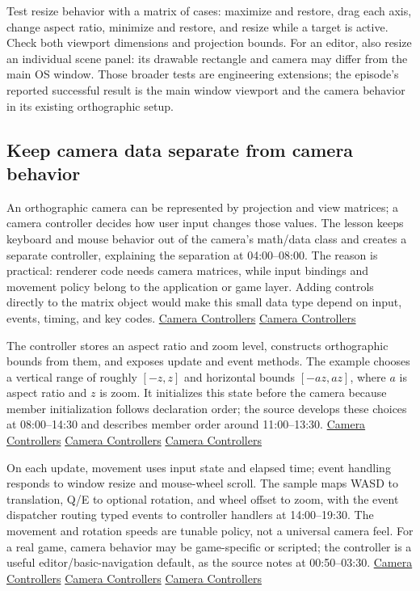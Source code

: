 Test resize behavior with a matrix of cases: maximize and restore, drag each axis, change aspect ratio, minimize and restore, and resize while a target is active. Check both viewport dimensions and projection bounds. For an editor, also resize an individual scene panel: its drawable rectangle and camera may differ from the main OS window. Those broader tests are engineering extensions; the episode's reported successful result is the main window viewport and the camera behavior in its existing orthographic setup.

\subsection{Keep camera data separate from camera behavior}\label{06-engine-ii-ch026-keep-camera-data-separate-from-camera-behavior}

An orthographic camera can be represented by projection and view matrices; a camera controller decides how user input changes those values. The lesson keeps keyboard and mouse behavior out of the camera's math/data class and creates a separate controller, explaining the separation at 04:00--08:00. The reason is practical: renderer code needs camera matrices, while input bindings and movement policy belong to the application or game layer. Adding controls directly to the matrix object would make this small data type depend on input, events, timing, and key codes. \href{https://www.youtube.com/watch?v=q7rwMoZQSmw&t=240s}{Camera Controllers} \href{https://www.youtube.com/watch?v=q7rwMoZQSmw&t=420s}{Camera Controllers}

The controller stores an aspect ratio and zoom level, constructs orthographic bounds from them, and exposes update and event methods. The example chooses a vertical range of roughly \([-z,z]\) and horizontal bounds \([-az,az]\), where \(a\) is aspect ratio and \(z\) is zoom. It initializes this state before the camera because member initialization follows declaration order; the source develops these choices at 08:00--14:30 and describes member order around 11:00--13:30. \href{https://www.youtube.com/watch?v=q7rwMoZQSmw&t=480s}{Camera Controllers} \href{https://www.youtube.com/watch?v=q7rwMoZQSmw&t=660s}{Camera Controllers} \href{https://www.youtube.com/watch?v=q7rwMoZQSmw&t=810s}{Camera Controllers}

On each update, movement uses input state and elapsed time; event handling responds to window resize and mouse-wheel scroll. The sample maps WASD to translation, Q/E to optional rotation, and wheel offset to zoom, with the event dispatcher routing typed events to controller handlers at 14:00--19:30. The movement and rotation speeds are tunable policy, not a universal camera feel. For a real game, camera behavior may be game-specific or scripted; the controller is a useful editor/basic-navigation default, as the source notes at 00:50--03:30. \href{https://www.youtube.com/watch?v=q7rwMoZQSmw&t=50s}{Camera Controllers} \href{https://www.youtube.com/watch?v=q7rwMoZQSmw&t=840s}{Camera Controllers} \href{https://www.youtube.com/watch?v=q7rwMoZQSmw&t=960s}{Camera Controllers}

